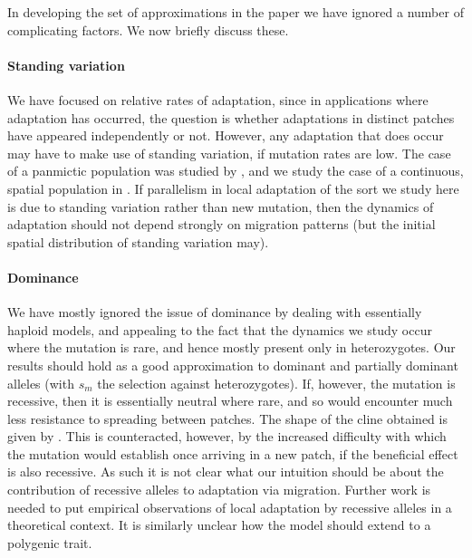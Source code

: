 \documentclass{article}
\newcommand{\linelabel}[1]{}
\newcommand{\citet}[1]{\cite{#1}}
\begin{document}
In developing the set of approximations in the paper we have ignored a
number of complicating factors. We now briefly discuss these.

\paragraph{Standing variation} 
We have focused on relative rates of adaptation,
since in applications where adaptation has occurred,
the question is whether adaptations in distinct patches
have appeared independently or not.
However, 
any adaptation that does occur may have to make use of standing variation,
if mutation rates are low.
The case of a panmictic population was studied by \citet{softsweepsI},
and we study the case of a continuous, spatial population in \citet{ralph2014standing}.
If parallelism in local adaptation of the sort we study here is due to standing variation
rather than new mutation,
then the dynamics of adaptation should not depend strongly on migration patterns
(but the initial spatial distribution of standing variation may).

\paragraph{Dominance}
We have mostly ignored the issue of dominance 
by dealing with essentially haploid models,
and appealing to the fact that the dynamics we study occur where the mutation is rare,
and hence mostly present only in heterozygotes. 
Our results should hold as a good approximation to dominant and partially dominant alleles
(with $s_m$ the selection against heterozygotes).
If, however, the mutation is recessive, then it is essentially neutral where rare,
and so would encounter much less resistance to spreading between patches.
The shape of the cline obtained is given by \citet{haldane1948theory}.
This is counteracted, however, by the increased difficulty with which the mutation would establish
once arriving in a new patch,
if the beneficial effect is also recessive. \linelabel{rr:dominance}
As such it is not clear what our intuition should be 
about the contribution of recessive alleles to adaptation via migration. 
Further work is needed to put empirical observations of local adaptation by recessive alleles 
in a theoretical context.
It is similarly unclear how the model should extend to a polygenic trait.
\end{document}
